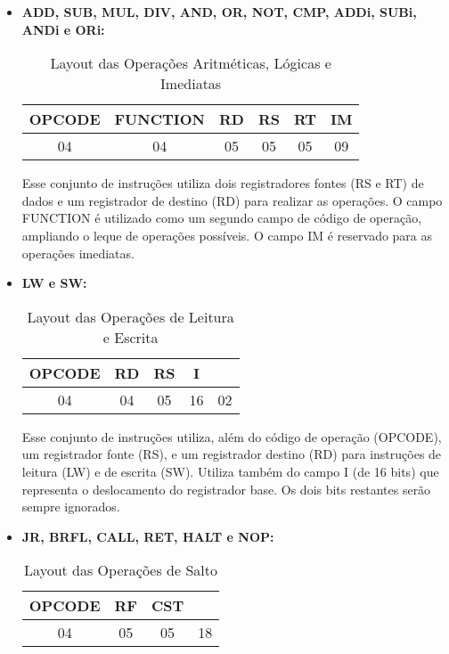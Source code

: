 \documentclass{report}
\begin{document}
  \begin{itemize}
     
     \item \textbf{ADD, SUB, MUL, DIV, AND, OR, NOT, CMP, ADDi, SUBi, ANDi e ORi:}

  \begin{table}[H]
\centering
	\begin{tabular}{|c|c|c|c|c|c|}
  	\hline 
  	\textbf{OPCODE} & \textbf{FUNCTION} & \textbf{RD} & \textbf{RS} & \textbf{RT} & \textbf{IM} \\ 
  	\hline 
  	04 & 04 & 05 & 05 & 05 & 09 \\ 
  	\hline 
  	\end{tabular} 
  	\caption{Layout das Operações Aritméticas, Lógicas e Imediatas}
  \end{table}
  
  Esse conjunto de instruções utiliza dois registradores fontes (RS e RT) de dados e um registrador de destino (RD) para realizar as operações. O campo FUNCTION é utilizado como um segundo campo de código de operação, ampliando o leque de operações possíveis. O campo IM é reservado para as operações imediatas.\\
  
   \item \textbf{LW e SW:}

  \begin{table}[H]
\centering
	\begin{tabular}{|c|c|c|c|c|}
  	\hline 
  	\textbf{OPCODE} & \textbf{RD} & \textbf{RS} & \textbf{I} & \textbf{} \\ 
  	\hline 
  	04 & 04 & 05 & 16 & 02 \\ 
  	\hline 
  	\end{tabular} 
  	\caption{Layout das Operações de Leitura e Escrita}
  \end{table}
  
  Esse conjunto de instruções utiliza, além do código de operação (OPCODE), um registrador fonte (RS), e um registrador destino (RD) para instruções de leitura (LW) e de escrita (SW). Utiliza também do campo I (de 16 bits) que representa o deslocamento do registrador base. Os dois bits restantes serão sempre ignorados.\\

  
  \item \textbf{JR, BRFL, CALL, RET, HALT e NOP:}

  \begin{table}[H]
\centering
	\begin{tabular}{|c|c|c|c|}
  	\hline 
  	\textbf{OPCODE} & \textbf{RF} & \textbf{CST} & \textbf{} \\ 
  	\hline 
  	04 & 05 & 05 & 18 \\ 
  	\hline 
  	\end{tabular} 
  	\caption{Layout das Operações de Salto}
  \end{table}
  

\end{itemize}
\end{document}
